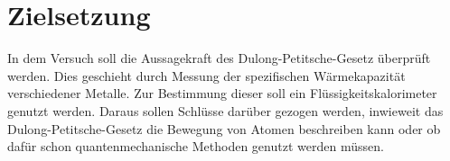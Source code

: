 \section{Zielsetzung}
\label{sec:Zielsetzung}

In dem Versuch soll die Aussagekraft des Dulong-Petitsche-Gesetz überprüft werden.
Dies geschieht durch Messung der spezifischen Wärmekapazität verschiedener Metalle.
Zur Bestimmung dieser soll ein Flüssigkeitskalorimeter genutzt werden.
Daraus sollen Schlüsse darüber gezogen werden, inwieweit das Dulong-Petitsche-Gesetz die Bewegung von Atomen beschreiben kann oder ob dafür schon quantenmechanische Methoden genutzt werden müssen.